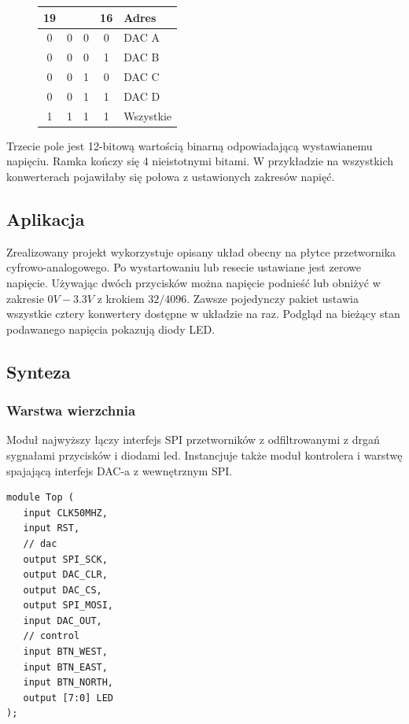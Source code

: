 \documentclass[a4paper,12pt]{article}
\begin{document}
\begin{figure}[htb]
  \centering
	\begin{tabular}{|c|c|c|c|l|}
	  \multicolumn{1}{r}{19}&\multicolumn{1}{r}{}&\multicolumn{1}{r}{}&\multicolumn{1}{r}{16}&\multicolumn{1}{l}{Adres}\\
		\hline
		0&0&0&0 & DAC A\\
		\hline
		0&0&0&1 & DAC B\\
		\hline
		0&0&1&0 & DAC C\\
		\hline
		0&0&1&1 & DAC D\\
		\hline
		1&1&1&1 & Wszystkie\\
		\hline
	\end{tabular}
\end{figure}

Trzecie pole jest 12-bitową wartością binarną odpowiadającą wystawianemu napięciu. Ramka kończy się 4 nieistotnymi bitami. W przykładzie na wszystkich konwerterach pojawiłaby się połowa z ustawionych zakresów napięć.


\subsection{Aplikacja}

Zrealizowany projekt wykorzystuje opisany układ obecny na płytce przetwornika cyfrowo-analogowego. Po wystartowaniu lub resecie ustawiane jest zerowe napięcie. Używając dwóch przycisków można napięcie podnieść lub obniżyć w zakresie $0V - 3.3V$ z krokiem $32 / 4096$. Zawsze pojedynczy pakiet ustawia wszystkie cztery konwertery dostępne w układzie na raz. Podgląd na bieżący stan podawanego napięcia pokazują diody LED.


\subsection{Synteza}

\subsubsection{Warstwa wierzchnia}

Moduł najwyższy łączy interfejs SPI przetworników z odfiltrowanymi z drgań sygnałami przycisków i diodami led. Instancjuje także moduł kontrolera i warstwę spajającą interfejs DAC-a z wewnętrznym SPI.
\begin{lstlisting}[label=Top,caption=Top.v]
module Top (
   input CLK50MHZ,
   input RST,
   // dac
   output SPI_SCK,
   output DAC_CLR,
   output DAC_CS,
   output SPI_MOSI,
   input DAC_OUT,
   // control
   input BTN_WEST,
   input BTN_EAST,
   input BTN_NORTH,
   output [7:0] LED
);
\end{lstlisting}
\end{document}
